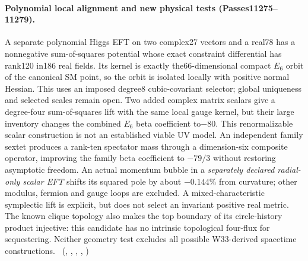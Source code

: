 \paragraph{Polynomial local alignment and new physical tests (Passes11275--11279).}
A separate polynomial Higgs EFT on two complex27 vectors and a real78
has a nonnegative sum-of-squares potential whose exact constraint differential
has rank120 in186 real fields. Its kernel is exactly the66-dimensional compact
$E_6$ orbit of the canonical SM point, so the orbit is isolated locally with
positive normal Hessian. This uses an imposed degree8 cubic-covariant selector;
global uniqueness and selected scales remain open. Two added complex matrix
scalars give a degree-four sum-of-squares lift with the same local gauge kernel,
but their large inventory changes the combined $E_6$ beta coefficient to$-80$.
This renormalizable scalar construction is not an established viable UV model.
An independent family sextet produces a rank-ten spectator mass through a
dimension-six composite operator, improving the family beta coefficient to
$-79/3$ without restoring asymptotic freedom. An actual momentum bubble in a
\emph{separately declared radial-only scalar EFT} shifts its squared pole by
about $-0.144\%$ from curvature; other modulus, fermion and gauge loops are
excluded. A mixed-characteristic symplectic lift is explicit, but does not
select an invariant positive real metric. The known clique topology also makes
the top boundary of its circle-history product injective: this candidate has
no intrinsic topological four-flux for sequestering. Neither geometry test
excludes all possible W33-derived spacetime constructions.
\tierC\ (,
,
,
,
)

